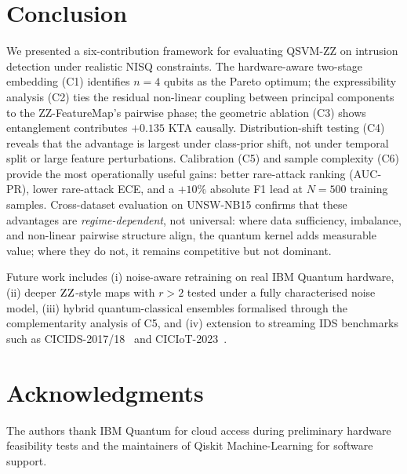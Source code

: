 \documentclass[journal]{IEEEtran}
\newcommand{\ZZ}{\textsc{ZZ}}
\newcommand{\QSVM}{QSVM-\ZZ}
\begin{document}
  \section{Conclusion}\label{sec:conclusion}
  We presented a six-contribution framework for evaluating \QSVM{} on
  intrusion detection under realistic NISQ constraints. The hardware-aware
  two-stage embedding (C1) identifies $n{=}4$ qubits as the Pareto
  optimum; the expressibility analysis (C2) ties the residual
  non-linear coupling between principal components to the
  \ZZ{}-FeatureMap's pairwise phase; the geometric ablation (C3) shows
  entanglement contributes $+0.135$ KTA causally. Distribution-shift
  testing (C4) reveals that the advantage is largest under class-prior
  shift, not under temporal split or large feature perturbations.
  Calibration (C5) and sample complexity (C6) provide the most
  operationally useful gains: better rare-attack ranking (AUC-PR),
  lower rare-attack ECE, and a $+10\%$ absolute F1 lead at $N{=}500$
  training samples. Cross-dataset evaluation on UNSW-NB15 confirms
  that these advantages are \emph{regime-dependent}, not universal:
  where data sufficiency, imbalance, and non-linear pairwise
  structure align, the quantum kernel adds measurable value; where
  they do not, it remains competitive but not dominant.

  Future work includes (i) noise-aware retraining on real IBM Quantum
  hardware, (ii) deeper $\ZZ$-style maps with $r{>}2$ tested under a
  fully characterised noise model, (iii) hybrid quantum-classical
  ensembles formalised through the complementarity analysis of C5,
  and (iv) extension to streaming IDS benchmarks such as
  CICIDS-2017/18~\cite{sharafaldin2018cicids} and
  CICIoT-2023~\cite{dadkhah2023ciciot}.

  \section*{Acknowledgments}
  The authors thank IBM Quantum for cloud access during preliminary
  hardware feasibility tests and the maintainers of Qiskit
  Machine-Learning for software support.
\end{document}
